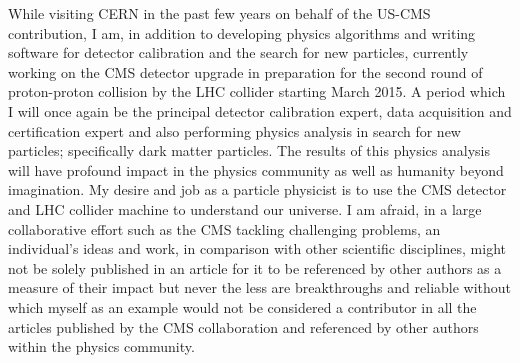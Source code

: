 \documentclass[12pt]{article}
\begin{document}
While visiting CERN in the past few years on behalf of the US-CMS contribution, I am, in addition to developing physics algorithms and writing software for detector calibration and the search for new particles, currently working on the CMS detector upgrade in preparation for the second round of proton-proton collision by the LHC collider starting March 2015. A period which I will once again be the principal detector calibration expert, data acquisition and certification expert and also performing physics analysis in search for new particles; specifically dark matter particles. The results of this physics analysis will have profound impact in the physics community as well as humanity beyond imagination.
My desire and job as a particle physicist is to use the CMS detector and LHC collider machine to understand our universe. I am afraid, in a large collaborative effort such as the CMS tackling challenging problems, an individual's ideas and work, in comparison with other scientific disciplines, might not be solely published in an article for it to be referenced by other authors as a measure of their impact but never the less are breakthroughs and reliable without which myself as an example would not be considered a contributor in all the articles published by the CMS collaboration and referenced by other authors within the physics community.
\end{document}
